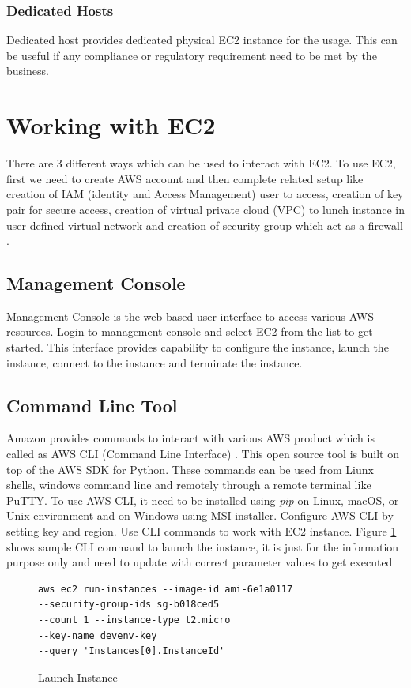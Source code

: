 \subsubsection{Dedicated Hosts} \cite{www-aws-ec2Pricing}
Dedicated host provides dedicated physical EC2 instance for the usage. This can be useful if any compliance or regulatory requirement need to be met by the business.

\section{Working with EC2}
There are 3 different ways which can be used to interact with EC2. To use EC2, first we need to create AWS account and then complete related setup like creation of IAM (identity and Access Management) user to access, creation of key pair for secure access, creation of virtual private cloud (VPC) to lunch instance in user defined virtual network and creation of security group which act as a firewall \cite{www-aws-ec2-setup}.

\subsection{Management Console}
Management Console \cite{www-aws-ec2-gettingStarted} is the web based user interface to access various AWS resources. Login to management console and select EC2 from the list to get started. This interface provides capability to configure the instance, launch the instance, connect to the instance and terminate the instance.

\subsection{Command Line Tool}
Amazon provides commands to interact with various AWS product which is called as AWS CLI (Command Line Interface) \cite{www-aws-ec2-cli}. This open source tool is built on top of the AWS SDK for Python. These commands can be used from Liunx shells, windows command line and remotely through a remote terminal like PuTTY. To use AWS CLI, it need to be installed using \emph{pip} on Linux, macOS, or Unix environment and on Windows using MSI installer. Configure AWS CLI by setting key and region. Use CLI commands to work with EC2 instance.
Figure \ref{c:cli-launch} shows sample CLI command to launch the instance, it is just for the information purpose only and need to update with correct parameter values to get executed
\begin{figure}[htb]
\begin{verbatim}
aws ec2 run-instances --image-id ami-6e1a0117
--security-group-ids sg-b018ced5 
--count 1 --instance-type t2.micro 
--key-name devenv-key 
--query 'Instances[0].InstanceId'
\end{verbatim}
\caption{Launch Instance \cite{www-aws-ec2-cli}}\label{c:cli-launch}
\end{figure}

